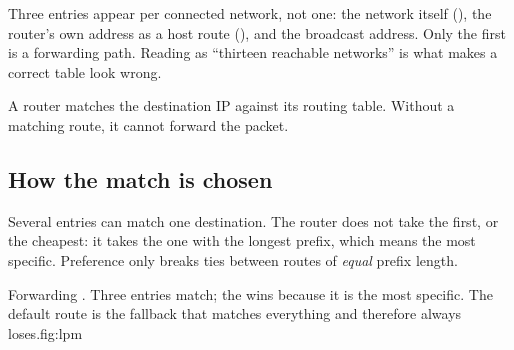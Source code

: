 \begin{pitfall}
Three entries appear per connected network, not one: the network itself
(), the router's own address as a host route (), and the
broadcast address. Only the first is a forwarding path. Reading
 as ``thirteen reachable networks'' is what makes a
correct table look wrong.
\end{pitfall}

\begin{keyidea}
A router matches the destination IP against its routing table. Without a matching route, it cannot forward the packet.
\end{keyidea}

\subsection{How the match is chosen}
Several entries can match one destination. The router does not take the
first, or the cheapest: it takes the one with the longest prefix, which
means the most specific. Preference only breaks ties between routes of
\emph{equal} prefix length.

\begin{utpfig}{Forwarding . Three entries match;
the  wins because it is the most specific. The default route is the
fallback that matches everything and therefore always loses.}{fig:lpm}
\end{utpfig}

